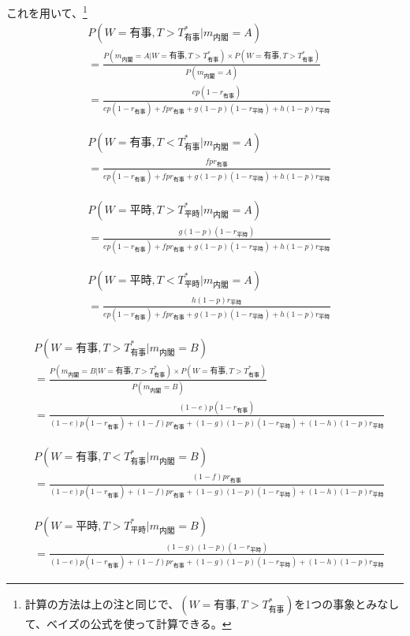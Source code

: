 \documentclass[main.tex]{subfiles}
\begin{document}
これを用いて、\footnote{計算の方法は上の注と同じで、$(W=有事, T>T^*_{有事})$を1つの事象とみなして、ベイズの公式を使って計算できる。}
\begin{align*}
    & P(W=有事, T>T^*_{有事} | m_{内閣}=A)\\[0.5em]
    &= \frac{ P(m_{内閣}=A| W={有事}, T>T^*_{有事}) × P(W={有事}, T>T^*_{有事}) }{ P(m_{内閣}=A) } \\[1em]
    &= \frac{ ep(1-r_{有事}) }{ ep(1-r_{有事}) + fpr_{有事} + g(1-p)(1-r_{平時}) + h(1-p)r_{平時} }
\end{align*}

\begin{align*}
    & P(W=有事, T<T^*_{有事} | m_{内閣}=A)\\[0.5em]
    &= \frac{ fpr_{有事} }{ ep(1-r_{有事}) + fpr_{有事} + g(1-p)(1-r_{平時}) + h(1-p)r_{平時} }
\end{align*}

\begin{align*}
    & P(W=平時, T>T^*_{平時} | m_{内閣}=A)\\[0.5em]
    &= \frac{ g(1-p)(1-r_{平時}) }{ ep(1-r_{有事}) + fpr_{有事} + g(1-p)(1-r_{平時}) + h(1-p)r_{平時} }
\end{align*}

\begin{align*}
    & P(W=平時, T<T^*_{平時} | m_{内閣}=A)\\[0.5em]
    &= \frac{ h(1-p)r_{平時} }{ ep(1-r_{有事}) + fpr_{有事} + g(1-p)(1-r_{平時}) + h(1-p)r_{平時} }
\end{align*}



\begin{align*}
    & P(W=有事, T>T^*_{有事} | m_{内閣}=B)\\[0.5em]
    &= \frac{ P(m_{内閣}=B| W={有事}, T>T^*_{有事}) × P(W={有事}, T>T^*_{有事}) }{ P(m_{内閣}=B) } \\[1em]
    &= \frac{ (1-e)p(1-r_{有事}) }{ (1-e)p(1-r_{有事}) + (1-f)pr_{有事} + (1-g)(1-p)(1-r_{平時}) + (1-h)(1-p)r_{平時} }
\end{align*}

\begin{align*}
    & P(W=有事, T<T^*_{有事} | m_{内閣}=B)\\[0.5em]
    &= \frac{ (1-f)pr_{有事} }{ (1-e)p(1-r_{有事}) + (1-f)pr_{有事} + (1-g)(1-p)(1-r_{平時}) + (1-h)(1-p)r_{平時} }
\end{align*}

\begin{align*}
    & P(W=平時, T>T^*_{平時} | m_{内閣}=B)\\[0.5em]
    &= \frac{ (1-g)(1-p)(1-r_{平時}) }{ (1-e)p(1-r_{有事}) + (1-f)pr_{有事} + (1-g)(1-p)(1-r_{平時}) + (1-h)(1-p)r_{平時} }
\end{align*}
\end{document}
